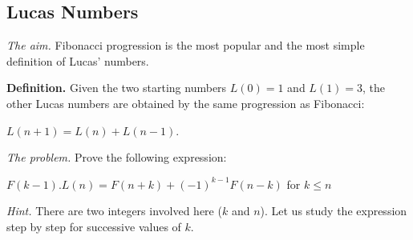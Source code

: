 {\subsection{Lucas Numbers} 

\noindent \textit{The aim.}
Fibonacci progression is the most popular and the most simple definition of Lucas' numbers.
\medskip

\textbf{Definition.}
Given the two starting numbers $L(0) = 1$ and $L(1) = 3$, 
the other Lucas numbers are obtained by the same progression as Fibonacci: 

$L(n+1) = L(n)+L(n-1)$.
\medskip

%
%

\noindent \textit{The problem.}
Prove the following expression:

$F(k-1).L(n) = F(n+k)+ (-1)^{k-1}F(n-k)$ for $k \leq n$
\bigskip

\noindent \textit{Hint.} 
There are two integers involved here ($k$ and $n$).
Let us study the expression step by step for successive values of $k$.
\medskip

}
